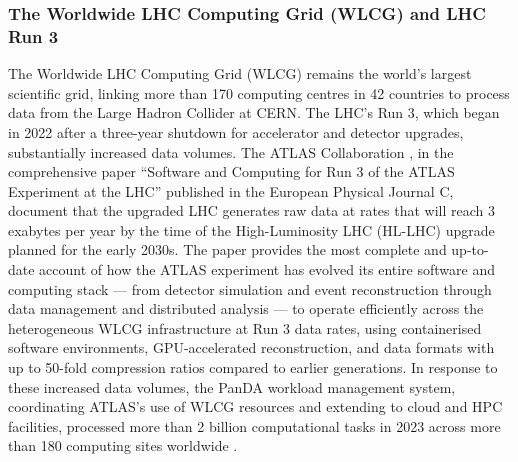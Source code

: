 \documentclass[12pt,a4paper]{report}
\begin{document}
\subsubsection{The Worldwide LHC Computing Grid (WLCG) and LHC Run 3}
The Worldwide LHC Computing Grid (WLCG) remains the world’s largest scientific grid, linking more than 170 computing centres in 42 countries to 
process data from the Large Hadron Collider at CERN. The LHC’s Run 3, which began in 2022 after a three-year shutdown for accelerator and detector
 upgrades, substantially increased data volumes. The ATLAS Collaboration \parencite{atlas2025software}, in the comprehensive paper “Software and Computing for Run 3 of 
 the ATLAS Experiment at the LHC” published in the European Physical Journal C, document that the upgraded LHC generates raw data at rates that
  will reach 3 exabytes per year by the time of the High-Luminosity LHC (HL-LHC) upgrade planned for the early 2030s. The paper provides the most
   complete and up-to-date account of how the ATLAS experiment has evolved its entire software and computing stack — from detector simulation and
    event reconstruction through data management and distributed analysis — to operate efficiently across the heterogeneous WLCG infrastructure at 
    Run 3 data rates, using containerised software environments, GPU-accelerated reconstruction, and data formats with up to 50-fold compression 
    ratios compared to earlier generations. In response to these increased data volumes, the PanDA workload management system, coordinating ATLAS’s 
    use of WLCG resources and extending to cloud and HPC facilities, processed more than 2 billion computational tasks in 2023 across more than 180
     computing sites worldwide \parencite{maeno2024panda}.
\end{document}
